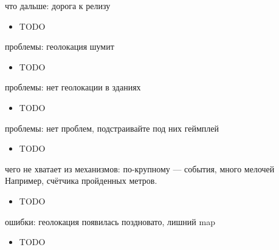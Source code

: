 \documentclass[aspectratio=169,handout,bigger]{beamer}
\begin{document}

\begin{frame}{что дальше: дорога к релизу}
  \begin{itemize}
    \item TODO
  \end{itemize}
\end{frame}


\begin{frame}{проблемы: геолокация шумит}
  \begin{itemize}
    \item TODO
  \end{itemize}
\end{frame}


\begin{frame}{проблемы: нет геолокации в зданиях}
  \begin{itemize}
    \item TODO
  \end{itemize}
\end{frame}


\begin{frame}{проблемы: нет проблем, подстраивайте под них геймплей}
  \begin{itemize}
    \item TODO
  \end{itemize}
\end{frame}


\begin{frame}{чего не хватает из механизмов: по-крупному --- события, много мелочей}
Например, счётчика пройденных метров.
\begin{itemize}
  \item TODO
\end{itemize}
\end{frame}


\begin{frame}{ошибки: геолокация появилась поздновато, лишний map}
  \begin{itemize}
    \item TODO
  \end{itemize}
\end{frame}
\end{document}
